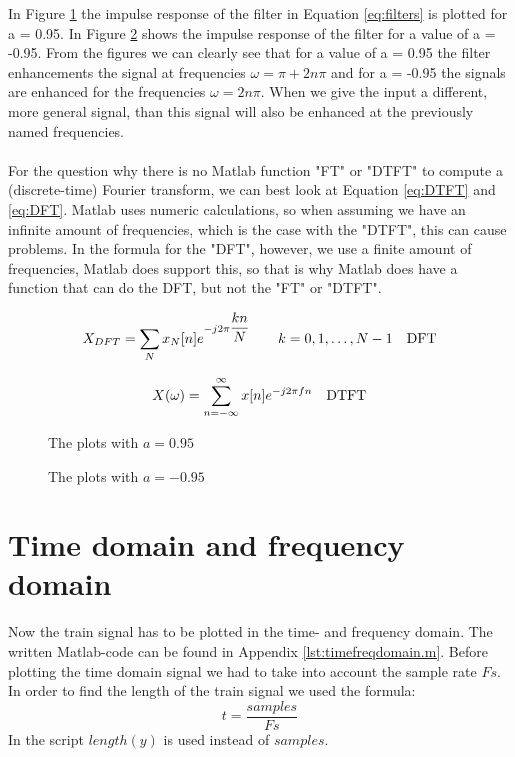 \documentclass[final]{scrreprt} %
\begin{document}
In Figure \ref{fig:a0.95-plots} the impulse response of the filter in Equation \ref{eq:filters} is plotted for a = 0.95. 
In Figure \ref{fig:a0.-95-plots} shows the impulse response of the filter for a value of a = -0.95.
From the figures we can clearly see that for a value of a = 0.95 the filter enhancements the signal at frequencies $\omega = \pi + 2n \pi$ and for a = -0.95 the signals are enhanced for the frequencies $\omega = 2n \pi$. 
When we give the input a different, more general signal, than this signal will also be enhanced at the previously named frequencies. 
\\
\\
For the question why there is no Matlab function "FT" or "DTFT" to compute a (discrete-time) Fourier transform, we can best look at Equation \ref{eq:DTFT} and \ref{eq:DFT}.
Matlab uses numeric calculations, so when assuming we have an infinite amount of frequencies, which is the case with the "DTFT", this can cause problems. 
In the formula for the "DFT", however, we use a finite amount of frequencies, Matlab does support this, so that is why Matlab does have a function that can do the DFT, but not the "FT" or "DTFT".


\begin{equation}
X_{DFT} = \sum_{N} x_N[n]e^{-j2\pi \dfrac{kn}{N}} \quad \quad k = 0, 1, \dots, N - 1 \quad \text{DFT}\\
\label{eq:DFT}
\end{equation}

\begin{equation}
X(\omega) = \sum_{n= -\infty}^{\infty} x[n]e^{-j2\pi fn} \quad \text{DTFT}\\
\label{eq:DTFT}
\end{equation}




\begin{figure}[H]
	\centering
    	\setlength\figureheight{3.5cm}
    	\setlength{}
    	    	
    	\caption{The plots with $a=0.95$}
    	\label{fig:a0.95-plots}
\end{figure}
\begin{figure}[H]
	\centering
    	\setlength\figureheight{3.5cm}
    	\setlength{}
    	    	
    	\caption{The plots with $a=-0.95$}
    	\label{fig:a0.-95-plots}
\end{figure}


\section{Time domain and frequency domain}
Now the train signal has to be plotted in the time- and frequency domain.
The written Matlab-code can be found in Appendix \ref{lst:timefreqdomain.m}.
Before plotting the time domain signal we had to take into account the sample rate $Fs$.
In order to find the length of the train signal we used the formula:
\begin{equation}
t = \frac{samples}{Fs}
\end{equation}
In the script $length(y)$ is used instead of $samples$.
\end{document}
